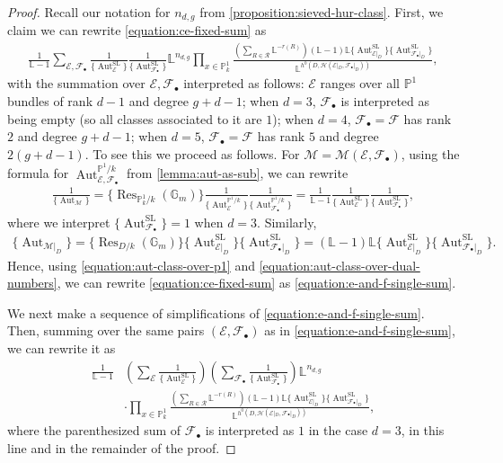 \documentclass[12 pt]{amsart}
\theoremstyle{plain}
\theoremstyle{definition}
\theoremstyle{remark}
\numberwithin{equation}{section}
\newcommand\bg{\mathbb G}
\newcommand\bl{\mathbb L}
\newcommand\bp{\mathbb P}
\newcommand\sce{\mathscr E}
\newcommand\scf{\mathscr F}
\newcommand\sch{\mathscr H}
\newcommand\ce{\mathscr M} %
\newcommand\systemdim[2]{n_{#1,#2}} %
\DeclareMathOperator\res{Res}
\DeclareMathOperator\aut{Aut}
\renewcommand\sl{\mathrm{SL}}
\begin{document}
\begin{proof}
Recall our notation for $\systemdim d g$ from
\autoref{proposition:sieved-hur-class}.
	First, we claim we can rewrite 
\eqref{equation:ce-fixed-sum} as
\begin{align}
	\label{equation:e-and-f-single-sum} \frac{1}{\bl - 1} \sum_{\sce,
	\scf_\bullet} \frac{1}{\{\aut^{\sl}_{\sce}\}}
	\frac{1}{\{\aut^{\sl}_{\scf_\bullet}\}} \bl^{\systemdim d g} \prod_{x \in
	\bp^1_k} \frac{\left( \sum_{R \in \mathcal R} \bl^{-r(R)} \right) (\bl
	-1)\bl\{\aut^{\sl}_{\sce|_D}\} \{\aut^{\sl}_{\scf_\bullet|_D}\}}{\bl^{h^0(D,
	\sch(\sce|_D, \scf_\bullet|_D))}}, \end{align} with the summation over
	$\sce, \scf_\bullet$ interpreted as follows: $\sce$ ranges over all
	$\bp^1$ bundles of rank $d - 1$ and degree $g + d -1$; when $d = 3$,
	$\scf_\bullet$ is interpreted as being empty (so all classes associated
	to it are $1$); when
	$d =4$, $\scf_\bullet = \scf$ has rank $2$ and degree $g + d -1$; 
	when $d = 5$, $\scf_\bullet = \scf$ has rank $5$ and degree $2(g + d -
	1)$.  
	To see this we proceed as follows. For $\ce = \ce(\sce, \scf_\bullet)$, using the formula for
	$\aut^{\bp^1/k}_{\sce, \scf_\bullet}$ from \autoref{lemma:aut-as-sub},
	we can rewrite \begin{align} \label{equation:aut-class-over-p1}
	\frac{1}{\{\aut_{\ce}\}} = \{\res_{\bp^1_k/k}(\bg_m)\}
		\frac{1}{\{\aut^{\bp^1/k}_{\sce}\}}
		\frac{1}{\{\aut^{\bp^1/k}_{\scf_\bullet}\}}= \frac{1}{\bl -1}
	\frac{1}{\{\aut^{\sl}_{\sce}\}} \frac{1}{\{\aut^{\sl}_{\scf_\bullet}\}},
\end{align} where we interpret $\{\aut^{\sl}_{\scf_\bullet}\} = 1$ when $d = 3$.
Similarly, \begin{align} \label{equation:aut-class-over-dual-numbers}
	\{\aut_{\ce|_D}\} = \{\res_{D/k}(\bg_m)\} \{\aut^{\sl}_{\sce|_D}\}
\{\aut^{\sl}_{\scf_\bullet|_D}\}
=
(\bl -1)\bl\{\aut^{\sl}_{\sce|_D}\}
\{\aut^{\sl}_{\scf_\bullet|_D}\}.  \end{align} 
Hence, using
\eqref{equation:aut-class-over-p1} and
\eqref{equation:aut-class-over-dual-numbers}, we can rewrite
\eqref{equation:ce-fixed-sum} as \eqref{equation:e-and-f-single-sum}.

We next make a sequence of simplifications of 
\eqref{equation:e-and-f-single-sum}.
Then, summing over the same pairs $(\sce,\scf_\bullet)$ as in
	\eqref{equation:e-and-f-single-sum}, we can rewrite it as 
	\begin{equation}
		\begin{aligned}
		\label{equation:e-and-f-single-sum-two} \frac{1}{\bl - 1} &\left(
		\sum_{\sce} \frac{1}{\{\aut^{\sl}_{\sce}\}} \right) \left(
		\sum_{\scf_\bullet} \frac{1}{\{\aut^{\sl}_{\scf_\bullet}\}}
	\right)   \bl^{\systemdim d g} \\
	&\cdot \prod_{x \in \bp^1_k} \frac{\left(
	\sum_{R \in \mathcal R} \bl^{-r(R)} \right) (\bl
-1)\bl\{\aut^{\sl}_{\sce|_D}\} \{\aut^{\sl}_{\scf_\bullet|_D}\}}{\bl^{h^0(D,
\sch(\sce|_D, \scf_\bullet|_D))}}, \end{aligned}
\end{equation}
where the parenthesized sum of
$\scf_\bullet$ is interpreted as $1$ in the case $d = 3$, in this line and in
the remainder of the proof.  


\end{proof}
\end{document}

